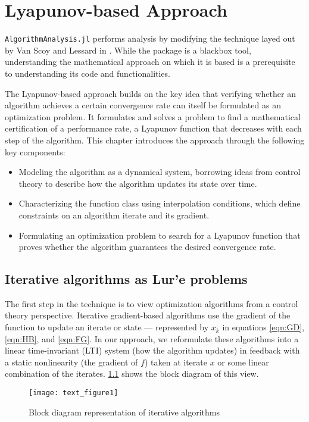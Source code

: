 \chapter{Lyapunov-based Approach}\label{chapter:lyapunov}

\texttt{AlgorithmAnalysis.jl} performs analysis by modifying the technique layed out by Van Scoy and Lessard in \cite{tutorial}. While the package is a blackbox tool, understanding the mathematical approach on which it is based is a prerequisite to understanding its code and functionalities.

The Lyapunov-based approach builds on the key idea that verifying whether an algorithm achieves a certain convergence rate can itself be formulated as an optimization problem. It formulates and solves a problem to find a mathematical certification of a performance rate, a Lyapunov function that decreases with each step of the algorithm. This chapter introduces the approach through the following key components:
\begin{itemize}
	\item Modeling the algorithm as a dynamical system, borrowing ideas from control theory to describe how the algorithm updates its state over time.
	\item Characterizing the function class using interpolation conditions, which define constraints on an algorithm iterate and its gradient.
	\item Formulating an optimization problem to search for a Lyapunov function that proves whether the algorithm guarantees the desired convergence rate.
\end{itemize}
\section{Iterative algorithms as Lur'e problems}

The first step in the technique is to view optimization algorithms from a control theory perspective. Iterative gradient-based algorithms use the gradient of the function to update an iterate or state --- represented by $x_k$ in equations \eqref{eqn:GD}, \eqref{eqn:HB}, and \eqref{eqn:FG}. In our approach, we reformulate these algorithms into a linear time-invariant (LTI) system (how the algorithm updates) in feedback with a static nonlinearity (the gradient of \(f\)) taken at iterate \(x\) or some linear combination of the iterates. \cref{plot_block_diagram} shows the block diagram of this view.
\begin{figure}[h]
    \centering
	\texttt{[image: text\_figure1]}
    \caption{Block diagram representation of iterative algorithms}
    \label{plot_block_diagram}
\end{figure}

